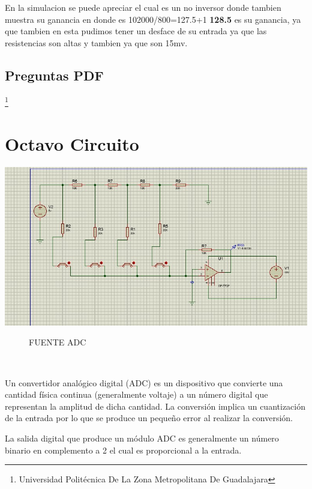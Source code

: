 \documentclass[10pt,a4paper]{article}
\begin{document}
En la simulacion se puede apreciar el cual es un no inversor donde tambien muestra su ganancia en donde es 102000/800=127.5+1 \textbf{128.5} es su ganancia, ya que tambien en esta pudimos tener un desface de su entrada ya que las resistencias son altas y tambien ya que son 15mv.







\subsection{Preguntas PDF}





\footnote{Universidad Politécnica De La Zona Metropolitana De Guadalajara} 

\newpage

\section{Octavo Circuito}
\begin{center}
\includegraphics[scale=0.3]{15.png}
 \begin{figure}[hbtp]
 \caption{FUENTE ADC}
 \centering
 \end{figure}\\
\end{center}
Un convertidor analógico digital (ADC) es un dispositivo que convierte una cantidad física continua (generalmente voltaje) a un número digital que representan la amplitud de dicha cantidad. La conversión implica un cuantización de la entrada por lo que se produce un pequeño error al realizar la conversión.

La salida digital que produce un módulo ADC es generalmente un número binario en complemento a 2 el cual es proporcional a la entrada.
\end{document}
